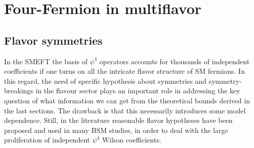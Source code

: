 \documentclass[a4paper,11pt]{article}
\begin{document}

\clearpage

\section{Four-Fermion in multiflavor}


\subsection{Flavor symmetries}
In the SMEFT the basis of $\psi^4$ operators accounts for thousands of independent coefficients if one turns on all the intricate flavor structure of SM fermions. In this regard, the need of specific hypothesis about symmetries and symmetry-breakings in the flavour sector plays an important role in addressing the key question of what information we can get from the theoretical bounds derived in the last sections. The drawback is that this necessarily introduces some model dependence. Still, in the literature reasonable flavor hypotheses have been proposed and used in many BSM studies, in order to deal with the large proliferation of independent $\psi^4$ Wilson coefficients. 
\end{document}
